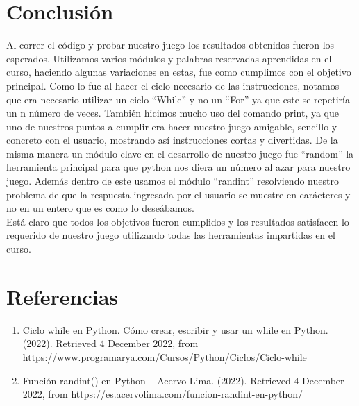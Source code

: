 \documentclass[12pt]{article}
\begin{document}
\section{Conclusión}
Al correr el código y probar nuestro juego los resultados obtenidos fueron los esperados. Utilizamos varios módulos y palabras reservadas aprendidas en el curso, haciendo algunas variaciones en estas, fue como cumplimos con el objetivo principal. Como lo fue al hacer el ciclo necesario de las instrucciones, notamos que era necesario utilizar un ciclo “While” y no un “For” ya que este se repetiría un n número de veces. 
También hicimos mucho uso del comando print, ya que uno de nuestros puntos a cumplir era hacer nuestro juego amigable, sencillo y concreto con el usuario, mostrando así instrucciones cortas y divertidas. 
De la misma manera un módulo clave en el desarrollo de nuestro juego fue “random” la herramienta principal para que python nos diera un número al azar para nuestro juego. Además dentro de este usamos el módulo “randint” resolviendo nuestro problema de que la respuesta ingresada por el usuario se muestre en carácteres y no en un entero que es como lo deseábamos. \\
Está claro que todos los objetivos fueron cumplidos y los resultados satisfacen lo requerido de nuestro juego utilizando todas las herramientas impartidas en el curso. 

\section{Referencias}
\begin{enumerate}
    \item Ciclo while en Python. Cómo crear, escribir y usar un while en Python. (2022). Retrieved 4 December 2022, from \\
    https://www.programarya.com/Cursos/Python/Ciclos/Ciclo-while\\    
    \item Función randint() en Python – Acervo Lima. (2022). Retrieved 4 December 2022, from https://es.acervolima.com/funcion-randint-en-python/
\end{enumerate}
\end{document}
